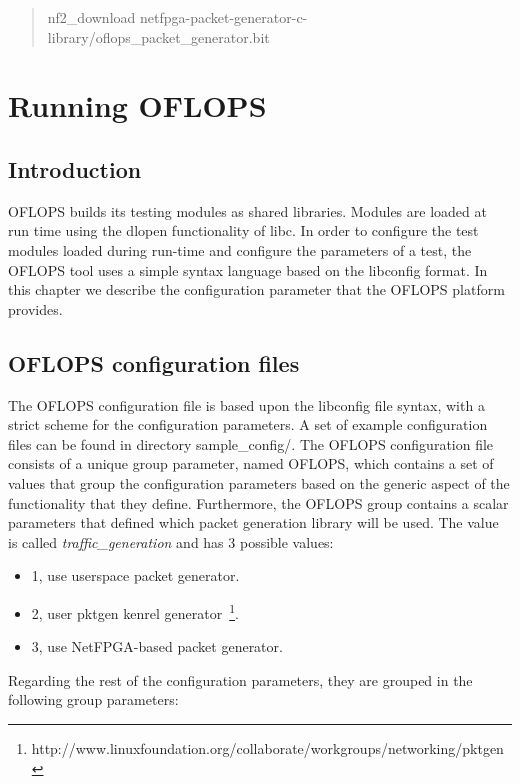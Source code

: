 \documentclass{book}
\begin{document}
\begin{quote}
    nf2\_download netfpga-packet-generator-c-library/oflops\_packet\_generator.bit
\end{quote}

\chapter{Running OFLOPS}

\section{Introduction}

OFLOPS builds its testing modules as shared libraries. Modules are 
loaded at run time using the dlopen functionality of libc. In order to
configure the test modules loaded during run-time and configure the
parameters of a test, the OFLOPS tool uses a simple syntax language based on
the libconfig format. In this chapter we describe the configuration parameter
that the OFLOPS platform provides.

\section{OFLOPS configuration files}
\label{oflops-config-lang}

The OFLOPS configuration file is based upon the libconfig file syntax, with 
a strict scheme for the configuration parameters. A set of example configuration 
files can be found in directory sample\_config/. The OFLOPS configuration file 
consists of a unique group parameter, named OFLOPS, which contains a set 
of values that group the configuration parameters based on the generic aspect
of the functionality that they define. Furthermore, the OFLOPS group contains a 
scalar parameters that defined which packet generation library will be used. The value is called 
\emph{traffic\_generation} and has 3 possible values: 
\begin{itemize}
    \item 1, use userspace packet generator.
    \item 2, user pktgen kenrel generator~\footnote{http://www.linuxfoundation.org/collaborate/workgroups/networking/pktgen}.
    \item 3, use NetFPGA-based packet generator. 
\end{itemize}
Regarding the rest of the configuration parameters, they are grouped in 
the following group parameters: 
\end{document}
